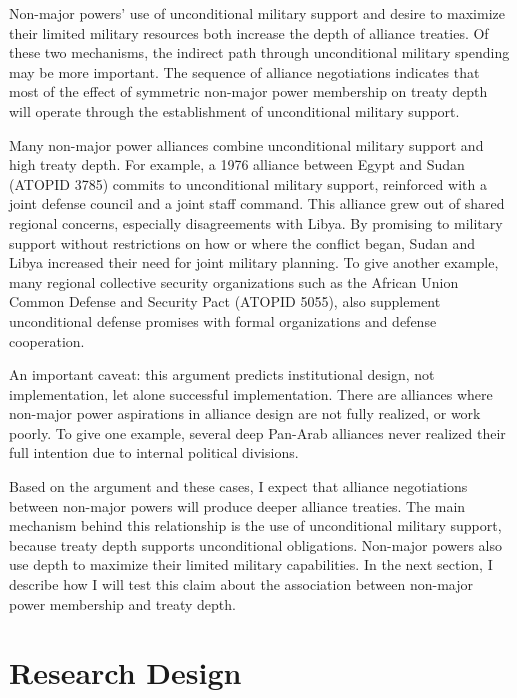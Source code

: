 \documentclass[12pt]{article}
\begin{document}
Non-major powers' use of unconditional military support and desire to maximize their limited military resources both increase the depth of alliance treaties. 
Of these two mechanisms, the indirect path through unconditional military spending may be more important.
The sequence of alliance negotiations indicates that most of the effect of symmetric non-major power membership on treaty depth will operate through the establishment of unconditional military support. 


Many non-major power alliances combine unconditional military support and high treaty depth. 
For example, a 1976 alliance between Egypt and Sudan (ATOPID 3785) commits to unconditional military support, reinforced with a joint defense council and a joint staff command. 
This alliance grew out of shared regional concerns, especially disagreements with Libya. 
By promising to military support without restrictions on how or where the conflict began, Sudan and Libya increased their need for joint military planning. 
To give another example, many regional collective security organizations such as the African Union Common Defense and Security Pact (ATOPID 5055), also supplement unconditional defense promises with formal organizations and defense cooperation.  


An important caveat: this argument predicts institutional design, not implementation, let alone successful implementation. 
There are alliances where non-major power aspirations in alliance design are not fully realized, or work poorly. 
To give one example, several deep Pan-Arab alliances never realized their full intention due to internal political divisions.  


Based on the argument and these cases, I expect that alliance negotiations between non-major powers will produce deeper alliance treaties. 
The main mechanism behind this relationship is the use of unconditional military support, because treaty depth supports unconditional obligations. 
Non-major powers also use depth to maximize their limited military capabilities. 
In the next section, I describe how I will test this claim about the association between non-major power membership and treaty depth. 




\section{Research Design}
\end{document}
